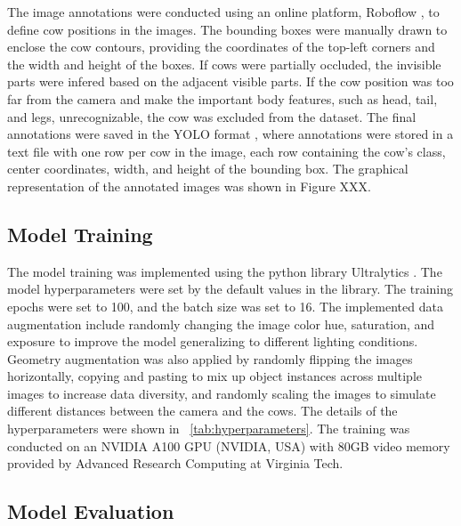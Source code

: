 The image annotations were conducted using an online platform, Roboflow \citep{}, to define cow positions in the images. The bounding boxes were manually drawn to enclose the cow contours, providing the coordinates of the top-left corners and the width and height of the boxes. If cows were partially occluded, the invisible parts were infered based on the adjacent visible parts. If the cow position was too far from the camera and make the important body features, such as head, tail, and legs, unrecognizable, the cow was excluded from the dataset. The final annotations were saved in the YOLO format \citep{}, where annotations were stored in a text file with one row per cow in the image, each row containing the cow's class, center coordinates, width, and height of the bounding box. The graphical representation of the annotated images was shown in Figure XXX.

\subsection*{Model Training}

The model training was implemented using the python library Ultralytics \citep{}. The model hyperparameters were set by the default values in the library. The training epochs were set to 100, and the batch size was set to 16. The implemented data augmentation include randomly changing the image color hue, saturation, and exposure to improve the model generalizing to different lighting conditions. Geometry augmentation was also applied by randomly flipping the images horizontally, copying and pasting to mix up object instances across multiple images to increase data diversity, and randomly scaling the images to simulate different distances between the camera and the cows. The details of the hyperparameters were shown in ~\ref{tab:hyperparameters}. The training was conducted on an NVIDIA A100 GPU (NVIDIA, USA) with 80GB video memory provided by Advanced Research Computing at Virginia Tech.


\subsection*{Model Evaluation}

